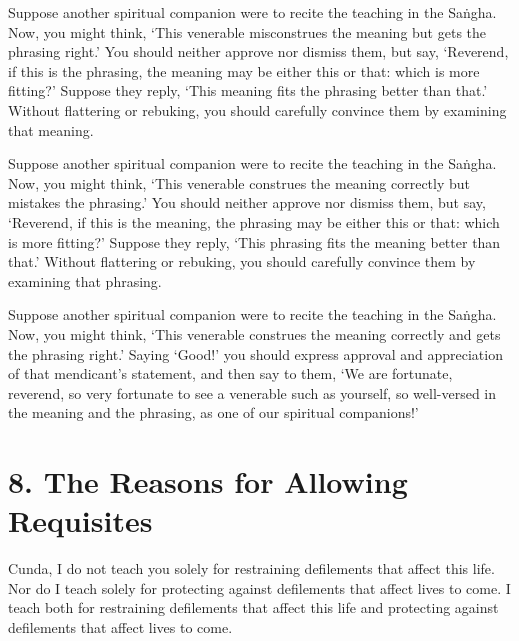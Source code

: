 \documentclass[12pt,openany]{book}%
\begin{document}
Suppose another spiritual companion were to recite the teaching in the \textsanskrit{Saṅgha}. Now, you might think, ‘This venerable misconstrues the meaning but gets the phrasing right.’ You should neither approve nor dismiss them, but say, ‘Reverend, if this is the phrasing, the meaning may be either this or that: which is more fitting?’ Suppose they reply, ‘This meaning fits the phrasing better than that.’ Without flattering or rebuking, you should carefully convince them by examining that meaning. 

Suppose another spiritual companion were to recite the teaching in the \textsanskrit{Saṅgha}. Now, you might think, ‘This venerable construes the meaning correctly but mistakes the phrasing.’ You should neither approve nor dismiss them, but say, ‘Reverend, if this is the meaning, the phrasing may be either this or that: which is more fitting?’ Suppose they reply, ‘This phrasing fits the meaning better than that.’ Without flattering or rebuking, you should carefully convince them by examining that phrasing. 

Suppose another spiritual companion were to recite the teaching in the \textsanskrit{Saṅgha}. Now, you might think, ‘This venerable construes the meaning correctly and gets the phrasing right.’ Saying ‘Good!’ you should express approval and appreciation of that mendicant’s statement, and then say to them, ‘We are fortunate, reverend, so very fortunate to see a venerable such as yourself, so well-versed in the meaning and the phrasing, as one of our spiritual companions!’ 

\section*{8. The Reasons for Allowing Requisites }

Cunda, I do not teach you solely for restraining defilements that affect this life. Nor do I teach solely for protecting against defilements that affect lives to come. I teach both for restraining defilements that affect this life and protecting against defilements that affect lives to come. 
\end{document}
